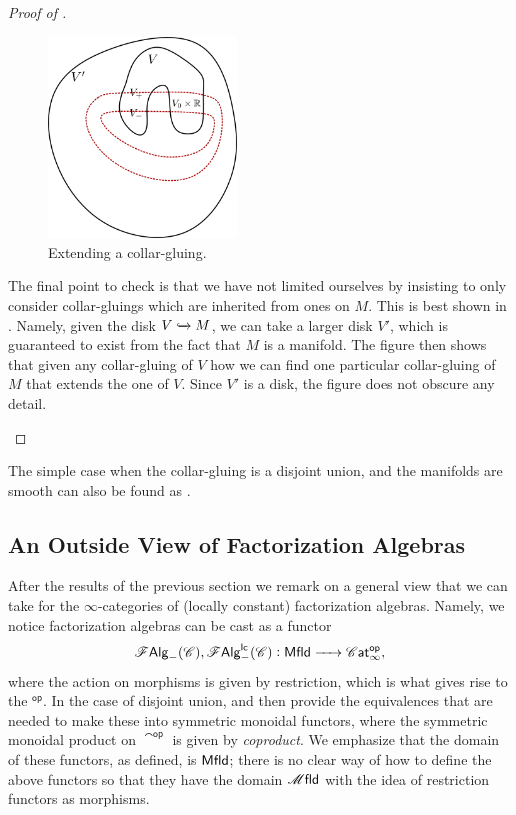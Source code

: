 \documentclass[../text]{subfiles}
\begin{document}
\begin{proof}[Proof of ]
    \begin{multicols}{2}
        \begin{figure}[H]
            \centering
            \includegraphics[width=5cm]{../images/extend_gluing.png}
            \caption{Extending a collar-gluing.}
            \label{fig:extend_gluing}
        \end{figure}
        The final point to check is that we have not limited ourselves by insisting to only consider collar-gluings which are inherited from ones on $M$. This is best shown in . Namely, given the disk $V \xhookrightarrow{} M$, we can take a larger disk $V'$, which is guaranteed to exist from the fact that $M$ is a manifold. The figure then shows that given any collar-gluing of $V$ how we can find one particular collar-gluing of $M$ that extends the one of $V$. Since $V'$ is a disk, the figure does not obscure any detail.
    \end{multicols}
\end{proof}

\begin{remark}
    The simple case when the collar-gluing is a disjoint union, and the manifolds are smooth can also be found as \cite[ex.5.4.5.4]{lurie_ha}.
\end{remark}


\subsection{An Outside View of Factorization Algebras}

After the results of the previous section we remark on a general view that we can take for the $\infty$-categories of (locally constant) factorization algebras. Namely, we notice factorization algebras can be cast as a functor
%
\begin{equation}
    \falg_{-}(\catC), \lcfa_{-}(\catC): \mfld[r] \xrightarrow{\ \ \ \ } \cat^{\mathsf{op}},
\end{equation}
%
where the action on morphisms is given by restriction, which is what gives rise to the $^{\mathsf{op}}$. In the case of disjoint union,  and  then provide the equivalences that are needed to make these into symmetric monoidal functors, where the symmetric monoidal product on $\cat^{\mathsf{op}}$ is given by \emph{coproduct}. We emphasize that the domain of these functors, as defined, is $\mfld[r]$; there is no clear way of how to define the above functors so that they have the domain $\mfld$ with the idea of restriction functors as morphisms.
\end{document}
